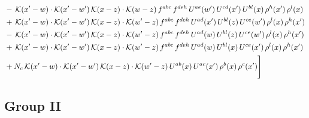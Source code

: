 \documentclass[9pt]{article}
\numberwithin{equation}{section}
\begin{document}
\begin{align}
& -\,\mathcal{K}(x'-w)\cdot\mathcal{K}(x'-w')\,\mathcal{K}(x-z)\cdot\mathcal{K}(w-z)\,f^{abc}\,f^{deh}\,U^{ae}(w')\,U^{cd}(x')\,U^{bl}(x)\,\rho^{h}(x')\,\rho^{l}(x)\notag\\
& +\,\mathcal{K}(x'-w)\cdot\mathcal{K}(x'-w')\,\mathcal{K}(x-z)\cdot\mathcal{K}(w'-z)\,f^{abc}\,f^{deh}\,U^{ad}(x')\,U^{bl}(z)\,U^{ce}(w')\,\rho^{l}(x)\,\rho^{h}(x')\notag\\
& -\,\mathcal{K}(x'-w)\cdot\mathcal{K}(x'-w')\,\mathcal{K}(x-z)\cdot\mathcal{K}(w'-z)\,f^{abc}\,f^{deh}\,U^{ad}(w)\,U^{bl}(z)\,U^{ce}(w')\,\rho^{l}(x)\,\rho^{h}(x')\notag\\
& +\,\mathcal{K}(x'-w)\cdot\mathcal{K}(x'-w')\,\mathcal{K}(x-z)\cdot\mathcal{K}(w'-z)\,f^{abc}\,f^{deh}\,U^{ad}(w)\,U^{bl}(x)\,U^{ce}(x')\,\rho^{l}(x)\,\rho^{h}(x')\notag\\
& +N_{c}\,\mathcal{K}(x'-w)\cdot\mathcal{K}(x'-w')\,\mathcal{K}(x-z)\cdot\mathcal{K}(w'-z)\,U^{ab}(x)\,U^{ac}(x')\,\rho^{b}(x)\,\rho^{c}(x')\Bigg]
\end{align}
\subsection{Group II}
\end{document}
